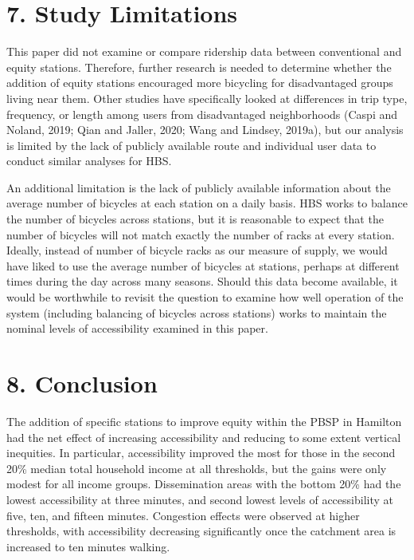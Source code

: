 \documentclass[]{elsarticle} %
\begin{document}
\hypertarget{study-limitations}{%
\section{7. Study Limitations}\label{study-limitations}}

This paper did not examine or compare ridership data between
conventional and equity stations. Therefore, further research is needed
to determine whether the addition of equity stations encouraged more
bicycling for disadvantaged groups living near them. Other studies have
specifically looked at differences in trip type, frequency, or length
among users from disadvantaged neighborhoods (Caspi and Noland, 2019;
Qian and Jaller, 2020; Wang and Lindsey, 2019a), but our analysis is
limited by the lack of publicly available route and individual user data
to conduct similar analyses for HBS.

An additional limitation is the lack of publicly available information
about the average number of bicycles at each station on a daily basis.
HBS works to balance the number of bicycles across stations, but it is
reasonable to expect that the number of bicycles will not match exactly
the number of racks at every station. Ideally, instead of number of
bicycle racks as our measure of supply, we would have liked to use the
average number of bicycles at stations, perhaps at different times
during the day across many seasons. Should this data become available,
it would be worthwhile to revisit the question to examine how well
operation of the system (including balancing of bicycles across
stations) works to maintain the nominal levels of accessibility examined
in this paper.

\hypertarget{conclusion}{%
\section{8. Conclusion}\label{conclusion}}

The addition of specific stations to improve equity within the PBSP in
Hamilton had the net effect of increasing accessibility and reducing to
some extent vertical inequities. In particular, accessibility improved
the most for those in the second 20\% median total household income at
all thresholds, but the gains were only modest for all income groups.
Dissemination areas with the bottom 20\% had the lowest accessibility at
three minutes, and second lowest levels of accessibility at five, ten,
and fifteen minutes. Congestion effects were observed at higher
thresholds, with accessibility decreasing significantly once the
catchment area is increased to ten minutes walking.
\end{document}
